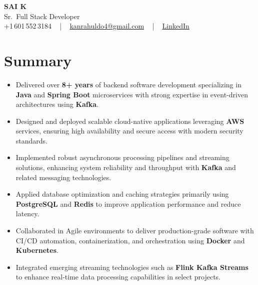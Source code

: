 \documentclass[letterpaper,11pt]{article}
\newcommand{\resumeItem}[1]{
  \item\footnotesize{
    {#1 \vspace{-2pt}}
  }
}
\newcommand{\resumeItemListStart}{\begin{itemize}[leftmargin=*]}
\newcommand{\resumeItemListEnd}{\end{itemize}\vspace{-5pt}}
\begin{document}
\begin{center}
    {\fontsize{14pt}{12pt}\selectfont \textbf{\MakeUppercase{Sai K}}}\\ \vspace{2pt}
    \fontsize{10pt}{12pt}\selectfont Sr.\ Full Stack Developer\\ \vspace{2pt}
    \fontsize{10pt}{12pt}\selectfont +1\,601\,552\,3184 ~ | ~
    \href{mailto:kanrahuldo4@gmail.com}{kanrahuldo4@gmail.com} ~ | ~
    \href{https://www.linkedin.com/in/srrrk/}{\color{blue}\underline{LinkedIn}}
    \vspace{-10pt}
\end{center}

\section{Summary}
\fontsize{9pt}{10pt}\selectfont
\resumeItemListStart
  \resumeItem{Delivered over \textbf{8+ years} of backend software development specializing in \textbf{Java} and \textbf{Spring Boot} microservices with strong expertise in event-driven architectures using \textbf{Kafka}.}
  \resumeItem{Designed and deployed scalable cloud-native applications leveraging \textbf{AWS} services, ensuring high availability and secure access with modern security standards.}
  \resumeItem{Implemented robust asynchronous processing pipelines and streaming solutions, enhancing system reliability and throughput with \textbf{Kafka} and related messaging technologies.}
  \resumeItem{Applied database optimization and caching strategies primarily using \textbf{PostgreSQL} and \textbf{Redis} to improve application performance and reduce latency.}
  \resumeItem{Collaborated in Agile environments to deliver production-grade software with CI/CD automation, containerization, and orchestration using \textbf{Docker} and \textbf{Kubernetes}.}
  \resumeItem{Integrated emerging streaming technologies such as \textbf{Flink Kafka Streams} to enhance real-time data processing capabilities in select projects.}
\resumeItemListEnd
\vspace{-6pt}

\end{document}

